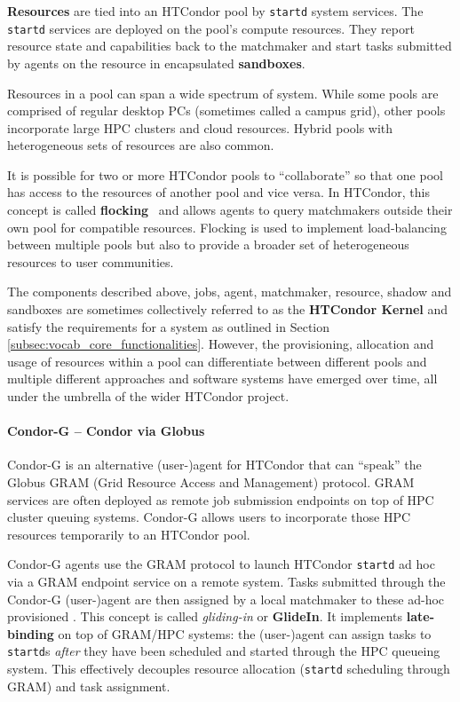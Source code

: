\documentclass{sig-alternate}
\begin{document}
\textbf{Resources} are tied into an HTCondor pool by \texttt{startd} system
services.
The \texttt{startd} services are deployed on the pool's compute resources.
They report resource state and  capabilities back to the matchmaker and start
tasks submitted by agents on the resource in encapsulated \textbf{sandboxes}.

Resources in a pool can span a wide spectrum of system. While some pools are
comprised of regular desktop PCs (sometimes called a campus grid), other pools
incorporate large HPC clusters and cloud resources.
Hybrid pools with heterogeneous sets of resources are also common.

It is possible for two or more HTCondor pools to ``collaborate'' so that one
pool has access to the resources of another pool and vice versa.
In HTCondor, this concept is called
\textbf{flocking}~\cite{Epema:1996:flocking} and allows agents to query
matchmakers outside their own pool for compatible resources.
Flocking is used to implement load-balancing between multiple pools but also to
provide a broader set of heterogeneous resources to user communities.

The components described above, jobs, agent, matchmaker, resource, shadow and
sandboxes are sometimes collectively referred to as the \textbf{HTCondor
Kernel} and satisfy the requirements for a \pilotjob system as outlined in
Section \ref{subsec:vocab_core_functionalities}.
However, the provisioning, allocation and usage of resources within a pool can
differentiate between different pools and multiple different approaches and
software systems have emerged over time, all under the umbrella of the wider
HTCondor project.

%
\paragraph{Condor-G -- Condor via Globus}

Condor-G is an alternative (user-)agent for HTCondor that can ``speak'' the
Globus GRAM (Grid Resource Access and Management) protocol. GRAM services are
often deployed as remote job submission endpoints on top of HPC cluster
queuing systems. Condor-G allows users to incorporate those HPC resources
temporarily to an HTCondor pool.

Condor-G agents use the GRAM protocol to launch HTCondor \texttt{startd}
\pilots ad hoc via a GRAM endpoint service on a remote system. Tasks submitted
through the Condor-G (user-)agent are then assigned by a local matchmaker to
these ad-hoc provisioned \pilots. This concept is called \textit {gliding-in}
or \textbf{GlideIn}. It implements \textbf{late-binding} on top of GRAM/HPC
systems: the (user-)agent can assign tasks to \texttt{startd}s \textit{after}
they have been scheduled and started through the HPC queueing system. This
effectively decouples resource allocation (\texttt{startd} scheduling through
GRAM) and task assignment.
\end{document}
